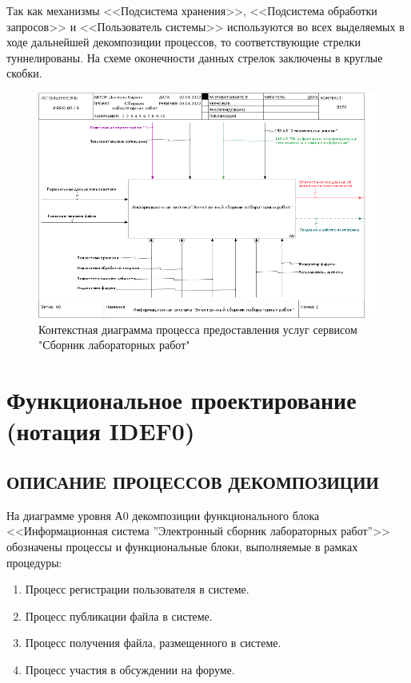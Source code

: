 \documentclass[a4paper,14pt]{extarticle}
\begin{document}
Так как механизмы <<Подсистема хранения>>, <<Подсистема обработки запросов>> и <<Пользователь системы>> 
используются во всех выделяемых в ходе дальнейшей декомпозиции процессов, то соответствующие стрелки туннелированы. На схеме оконечности данных стрелок заключены в круглые скобки.

\begin{figure}[h!]
	\centering
	\includegraphics[width=\linewidth]{images/ramus/01_A0}
	\caption{Контекстная диаграмма процесса предоставления услуг сервисом "Сборник лабораторных работ"}
	\label{fig:01a0}
\end{figure}
\newpage


\section{Функциональное проектирование (нотация IDEF0)}
\subsection{ОПИСАНИЕ ПРОЦЕССОВ ДЕКОМПОЗИЦИИ}
На диаграмме уровня А0 декомпозиции функционального блока
<<Информационная система ''Электронный сборник лабораторных работ''>> обозначены процессы и функциональные блоки,
выполняемые в рамках процедуры:

\begin{enumerate}
	\item Процесс регистрации пользователя в системе.
	\item 	Процесс публикации файла в системе.
	\item Процесс получения файла, размещенного в системе.
	\item Процесс участия в обсуждении на форуме.
\end{enumerate}
\end{document}
